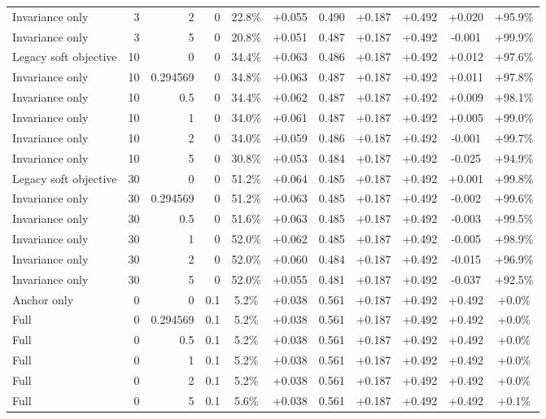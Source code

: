 \begin{table}[htbp]
\begin{tabular}{lrrrccccccc}
Invariance only & 3 & 2 & 0 & 22.8\% & +0.055 & 0.490 & +0.187 & +0.492 & +0.020 & +95.9\% \\
Invariance only & 3 & 5 & 0 & 20.8\% & +0.051 & 0.487 & +0.187 & +0.492 & -0.001 & +99.9\% \\
Legacy soft objective & 10 & 0 & 0 & 34.4\% & +0.063 & 0.486 & +0.187 & +0.492 & +0.012 & +97.6\% \\
Invariance only & 10 & 0.294569 & 0 & 34.8\% & +0.063 & 0.487 & +0.187 & +0.492 & +0.011 & +97.8\% \\
Invariance only & 10 & 0.5 & 0 & 34.4\% & +0.062 & 0.487 & +0.187 & +0.492 & +0.009 & +98.1\% \\
Invariance only & 10 & 1 & 0 & 34.0\% & +0.061 & 0.487 & +0.187 & +0.492 & +0.005 & +99.0\% \\
Invariance only & 10 & 2 & 0 & 34.0\% & +0.059 & 0.486 & +0.187 & +0.492 & -0.001 & +99.7\% \\
Invariance only & 10 & 5 & 0 & 30.8\% & +0.053 & 0.484 & +0.187 & +0.492 & -0.025 & +94.9\% \\
Legacy soft objective & 30 & 0 & 0 & 51.2\% & +0.064 & 0.485 & +0.187 & +0.492 & +0.001 & +99.8\% \\
Invariance only & 30 & 0.294569 & 0 & 51.2\% & +0.063 & 0.485 & +0.187 & +0.492 & -0.002 & +99.6\% \\
Invariance only & 30 & 0.5 & 0 & 51.6\% & +0.063 & 0.485 & +0.187 & +0.492 & -0.003 & +99.5\% \\
Invariance only & 30 & 1 & 0 & 52.0\% & +0.062 & 0.485 & +0.187 & +0.492 & -0.005 & +98.9\% \\
Invariance only & 30 & 2 & 0 & 52.0\% & +0.060 & 0.484 & +0.187 & +0.492 & -0.015 & +96.9\% \\
Invariance only & 30 & 5 & 0 & 52.0\% & +0.055 & 0.481 & +0.187 & +0.492 & -0.037 & +92.5\% \\
Anchor only & 0 & 0 & 0.1 & 5.2\% & +0.038 & 0.561 & +0.187 & +0.492 & +0.492 & +0.0\% \\
Full & 0 & 0.294569 & 0.1 & 5.2\% & +0.038 & 0.561 & +0.187 & +0.492 & +0.492 & +0.0\% \\
Full & 0 & 0.5 & 0.1 & 5.2\% & +0.038 & 0.561 & +0.187 & +0.492 & +0.492 & +0.0\% \\
Full & 0 & 1 & 0.1 & 5.2\% & +0.038 & 0.561 & +0.187 & +0.492 & +0.492 & +0.0\% \\
Full & 0 & 2 & 0.1 & 5.2\% & +0.038 & 0.561 & +0.187 & +0.492 & +0.492 & +0.0\% \\
Full & 0 & 5 & 0.1 & 5.6\% & +0.038 & 0.561 & +0.187 & +0.492 & +0.492 & +0.1\% \\

\end{tabular}
\end{table}
